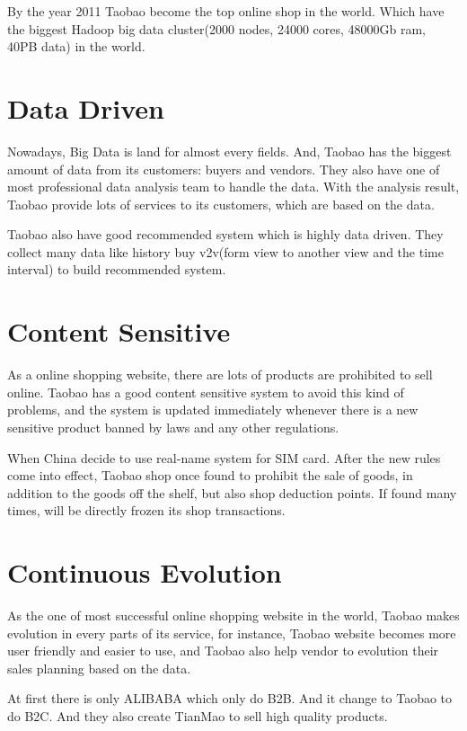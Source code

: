 \documentclass[titlepage]{article}
\begin{document}
By the year 2011 Taobao become the top online shop in the world. Which have
the biggest Hadoop big data cluster(2000 nodes, 24000 cores, 48000Gb ram, 40PB
data) in the world.

\section{Data Driven}
\label{sec:org80731a4}
Nowadays, Big Data is land for almost every fields. And, Taobao has the
biggest amount of data from its customers: buyers and vendors. They also have
one of most professional data analysis team to handle the data. With the
analysis result, Taobao provide lots of services to its customers, which are
based on the data.

Taobao also have good recommended system which is highly data driven. They
collect many data like history buy v2v(form view to another view and the time
interval) to build recommended system.

\section{Content Sensitive}
\label{sec:orgf2153e5}
As a online shopping website, there are lots of products are prohibited to
sell online. Taobao has a good content sensitive system to avoid this kind of
problems, and the system is updated immediately whenever there is a new
sensitive product banned by laws and any other regulations.

  When China decide to use real-name system for SIM card. After the new rules
come into effect, Taobao shop once found to prohibit the sale of goods, in
addition to the goods off the shelf, but also shop deduction points. If found
many times, will be directly frozen its shop transactions.

\section{Continuous Evolution}
\label{sec:org4339d94}

As the one of most successful online shopping website in the world, Taobao makes
evolution in every parts of its service, for instance, Taobao website becomes
more user friendly and easier to use, and Taobao also help vendor to evolution
their sales planning based on the data.

At first there is only ALIBABA which only do B2B. And it change to Taobao to do
B2C. And they also create TianMao to sell high quality products.
\end{document}
